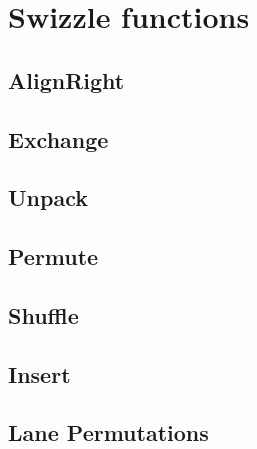 \section{Swizzle functions}


\subsection{AlignRight}






\subsection{Exchange}
\subsection{Unpack}
\subsection{Permute}
\subsection{Shuffle}
\subsection{Insert}
\subsection{Lane Permutations}
